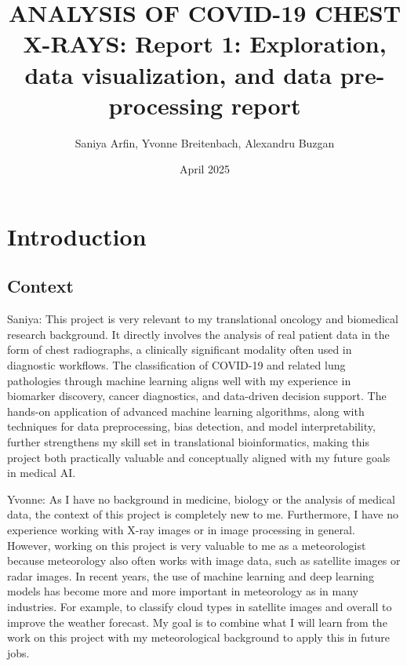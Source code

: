 \documentclass{article}
\title{ANALYSIS OF COVID-19 CHEST X-RAYS: Report 1: Exploration, data visualization, and data pre-processing report}
\author{Saniya Arfin, Yvonne Breitenbach, Alexandru Buzgan}
\date{April 2025}
\begin{document}
\maketitle

\tableofcontents

\newpage 

\section{Introduction}

\subsection{{Context}}

Saniya: This project is very relevant to my translational oncology and biomedical research background. It directly involves the analysis of real patient data in the form of chest radiographs, a clinically significant modality often used in diagnostic workflows. The classification of COVID-19 and related lung pathologies through machine learning aligns well with my experience in biomarker discovery, cancer diagnostics, and data-driven decision support. The hands-on application of advanced machine learning algorithms, along with techniques for data preprocessing, bias detection, and model interpretability, further strengthens my skill set in translational bioinformatics, making this project both practically valuable and conceptually aligned with my future goals in medical AI.\\

\vspace{0.3cm}

Yvonne: As I have no background in medicine, biology or the analysis of medical data, the context of this project is completely new to me. Furthermore, I have no experience working with X-ray images or in image processing in general.
However, working on this project is very valuable to me as a meteorologist because meteorology also often works with image data, such as satellite images or radar images. In recent years, the use of machine learning and deep learning models has become more and more important in meteorology as in many industries. For example, to classify cloud types in satellite images and overall to improve the weather forecast. 
My goal is to combine what I will learn from the work on this project with my meteorological background to apply this in future jobs. \\
\end{document}
